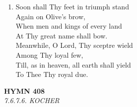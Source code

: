 \begin{enumerate}
    \item Soon shall Thy feet in triumph stand \\
        Again on Olive's brow, \\
        When men and kings of every land \\
        At Thy great name shall bow. \\
        Meanwhile, O Lord, Thy sceptre wield \\
        Among Thy loyal few, \\
        Till, as in heaven, all earth shall yield \\
        To Thee Thy royal due.

\end{enumerate}

\newpage
\begin{center}
    {\Large \textbf{HYMN 408}}
    \\
    \textit{7.6.7.6. KOCHER}
\end{center}
\vspace{1em}

